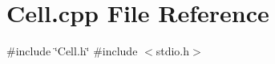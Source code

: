 \section{Cell.\+cpp File Reference}
\label{Cell_8cpp}
{\ttfamily \#include \char`\"{}Cell.\+h\char`\"{}}\newline
{\ttfamily \#include $<$stdio.\+h$>$}\newline
